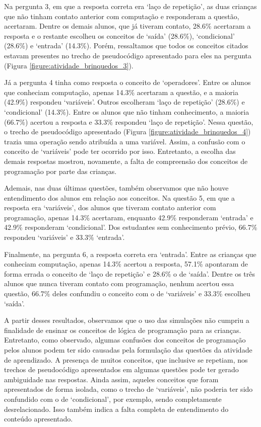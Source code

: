 Na pergunta 3, em que a resposta correta era \enquote*{laço de repetição}, as duas crianças que não tinham contato anterior com computação e responderam a questão, acertaram. Dentre os demais alunos, que já tiveram contato, 28.6\% acertaram a resposta e o restante escolheu os conceitos de \enquote*{saída} (28.6\%), \enquote*{condicional} (28.6\%) e \enquote*{entrada} (14.3\%). Porém, ressaltamos que todos os conceitos citados estavam presentes no trecho de pseudocódigo apresentado para eles na pergunta (Figura \ref{figure:atividade_brinquedos_3}).

Já a pergunta 4 tinha como resposta o conceito de \enquote*{operadores}. Entre os alunos que conheciam computação, apenas 14.3\% acertaram a questão, e a maioria (42.9\%) respondeu \enquote*{variáveis}. Outros escolheram \enquote*{laço de repetição} (28.6\%) e \enquote*{condicional} (14.3\%). Entre os alunos que não tinham conhecimento, a maioria (66.7\%) acertou a resposta e 33.3\% respondeu \enquote*{laço de repetição}. Nessa questão, o trecho de pseudocódigo apresentado (Figura \ref{figure:atividade_brinquedos_4}) trazia uma operação sendo atribuída a uma variável. Assim, a confusão com o conceito de \enquote*{variáveis} pode ter ocorrido por isso. Entretanto, a escolha das demais respostas mostrou, novamente, a falta de compreensão dos conceitos de programação por parte das crianças.

Ademais, nas duas últimas questões, também observamos que não houve entendimento dos alunos em relação aos conceitos. Na questão 5, em que a resposta era \enquote*{variáveis}, dos alunos que tiveram contato anterior com programação, apenas 14.3\% acertaram, enquanto 42.9\% responderam \enquote*{entrada} e 42.9\% responderam \enquote*{condicional}. Dos estudantes sem conhecimento prévio, 66.7\% respondeu \enquote*{variáveis} e 33.3\% \enquote*{entrada}.

Finalmente, na pergunta 6, a resposta correta era \enquote*{entrada}. Entre as crianças que conheciam computação, apenas 14.3\% acertou a resposta, 57.1\% apontaram de forma errada o conceito de \enquote*{laço de repetição} e 28.6\% o de \enquote*{saída}. Dentre os três alunos que nunca tiveram contato com programação, nenhum acertou essa questão, 66.7\% deles confundiu o conceito com o de \enquote*{variáveis} e 33.3\% escolheu \enquote*{saída}.

A partir desses resultados, observamos que o uso das simulações não cumpriu a finalidade de ensinar os conceitos de lógica de programação para as crianças. Entretanto, como observado, algumas confusões dos conceitos de programação pelos alunos podem ter sido causadas pela formulação das questões da atividade de aprendizado. A presença de muitos conceitos, que inclusive se repetiam, nos trechos de pseudocódigo apresentados em algumas questões pode ter gerado ambiguidade nas respostas. Ainda assim, aqueles conceitos que foram apresentados de forma isolada, como o trecho de \enquote*{variáveis}, não poderia ter sido confundido com o de \enquote*{condicional}, por exemplo, sendo completamente desrelacionado. Isso também indica a falta completa de entendimento do conteúdo apresentado.

